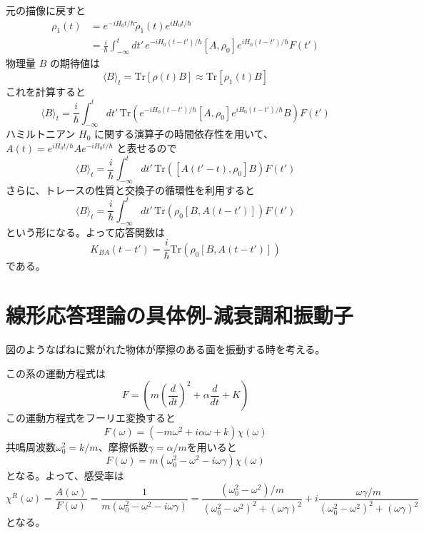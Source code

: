 \documentclass[11pt,a4j]{jreport}
\begin{document}
元の描像に戻すと
\begin{equation}
  \begin{aligned}
    \rho_1(t) &= e^{-i H_0 t / \hbar} \tilde{\rho}_1(t) e^{i H_0 t / \hbar} \\
    &= \frac{i}{\hbar} \int_{-\infty}^{t} dt' \, e^{-i H_0 (t - t') / \hbar} [A, \rho_0] e^{i H_0 (t - t') / \hbar} F(t') \label{eq:3.10}
  \end{aligned}
\end{equation}
物理量 $ B $ の期待値は  
\begin{equation}
  \langle B \rangle_t = \mathrm{Tr}[\rho(t) B] \approx \mathrm{Tr}[\rho_1(t) B]
\end{equation}
これを計算すると
\begin{equation}
  \langle B \rangle_t = \frac{i}{\hbar} \int_{-\infty}^{t} dt' \, \mathrm{Tr}\left( e^{-i H_0 (t - t') / \hbar} [A, \rho_0] e^{i H_0 (t - t') / \hbar} B \right) F(t')
\end{equation}
ハミルトニアン $H_0$ に関する演算子の時間依存性を用いて、$A(t) = e^{i H_0 t / \hbar} A e^{-i H_0 t / \hbar}$ と表せるので 
\begin{equation}
  \langle B \rangle_t = \frac{i}{\hbar} \int_{-\infty}^{t} dt' \, \mathrm{Tr}\left( [A(t' - t), \rho_0] B \right) F(t') 
\end{equation}
さらに、トレースの性質と交換子の循環性を利用すると
\begin{equation}
  \langle B \rangle_t = \frac{i}{\hbar} \int_{-\infty}^{t} dt' \, \mathrm{Tr}\left( \rho_0 [B, A(t - t')] \right) F(t') 
\end{equation}
という形になる。よって応答関数は
\begin{equation}
  K_{BA}(t - t') = \frac{i}{\hbar} \mathrm{Tr}\left( \rho_0 [B, A(t - t')] \right)
\end{equation}
である。
\section{線形応答理論の具体例-減衰調和振動子}
図のようなばねに繋がれた物体が摩擦のある面を振動する時を考える。\par
この系の運動方程式は
\begin{equation}
  F=\left(m\left(\frac{d}{dt}\right)^2+\alpha\frac{d}{dt}+K\right)
\end{equation}
この運動方程式をフーリエ変換すると
\begin{equation}
 F(\omega)=(-m\omega^2+i\alpha\omega+k)\chi(\omega)
\end{equation}
共鳴周波数$\omega_0^2=k/m$、摩擦係数$\gamma=\alpha/m$を用いると
\begin{equation}
  F(\omega)=m(\omega_0^2-\omega^2-i\omega\gamma)\chi(\omega)
\end{equation}
となる。よって、感受率は
\begin{equation}
 \chi^R(\omega)=\frac{A(\omega)}{F(\omega)}=\frac{1}{m(\omega_0^2-\omega^2-i\omega\gamma)}=\frac{(\omega_0^2 - \omega^2)/m}
 {\left(\omega_0^2 - \omega^2\right)^2 + \left(\omega \gamma\right)^2} + i \frac{\omega \gamma / m}{\left(\omega_0^2 - \omega^2\right)^2 + \left(\omega \gamma\right)^2}
\end{equation}
となる。
\end{document}
